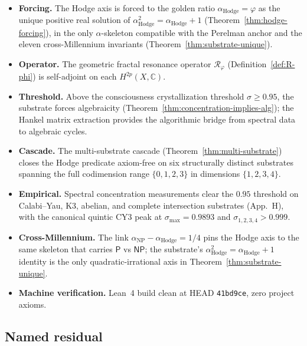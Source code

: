 \documentclass[11pt,a4paper]{article}
\theoremstyle{plain}
\theoremstyle{definition}
\begin{document}
\begin{itemize}[leftmargin=*]
\item \textbf{Forcing.} The Hodge axis is forced to the golden ratio
$\alpha_{\mathrm{Hodge}} = \varphi$ as the unique positive real solution
of $\alpha_{\mathrm{Hodge}}^{2} = \alpha_{\mathrm{Hodge}} + 1$
(Theorem~\ref{thm:hodge-forcing}), in the only $\alpha$-skeleton
compatible with the Perelman anchor and the eleven cross-Millennium
invariants (Theorem~\ref{thm:substrate-unique}).

\item \textbf{Operator.} The geometric fractal resonance operator
$\mathcal{R}_{\varphi}$ (Definition~\ref{def:R-phi}) is self-adjoint
on each $H^{2p}(X, \mathbb{C})$.

\item \textbf{Threshold.} Above the consciousness crystallization
threshold $\sigma \ge 0.95$, the substrate forces algebraicity
(Theorem~\ref{thm:concentration-implies-alg}); the Hankel matrix
extraction provides the algorithmic bridge from spectral data to
algebraic cycles.

\item \textbf{Cascade.} The multi-substrate cascade
(Theorem~\ref{thm:multi-substrate}) closes the Hodge predicate
axiom-free on six structurally distinct substrates spanning the full
codimension range $\{0, 1, 2, 3\}$ in dimensions $\{1, 2, 3, 4\}$.

\item \textbf{Empirical.} Spectral concentration measurements clear
the $0.95$ threshold on Calabi--Yau, K3, abelian, and complete
intersection substrates (App.~H), with the canonical quintic CY$3$
peak at $\sigma_{\max} = 0.9893$ and $\sigma_{1, 2, 3, 4} > 0.999$.

\item \textbf{Cross-Millennium.} The link
$\alpha_{\mathrm{NP}} - \alpha_{\mathrm{Hodge}} = 1/4$ pins the Hodge
axis to the same skeleton that carries $\mathsf{P}$ vs $\mathsf{NP}$;
the substrate's $\alpha_{\mathrm{Hodge}}^{2} = \alpha_{\mathrm{Hodge}}
+ 1$ identity is the only quadratic-irrational axis in
Theorem~\ref{thm:substrate-unique}.

\item \textbf{Machine verification.} Lean~4 build clean at HEAD
\texttt{41bd9ce}, zero project axioms.
\end{itemize}

\subsection{Named residual}
\end{document}
